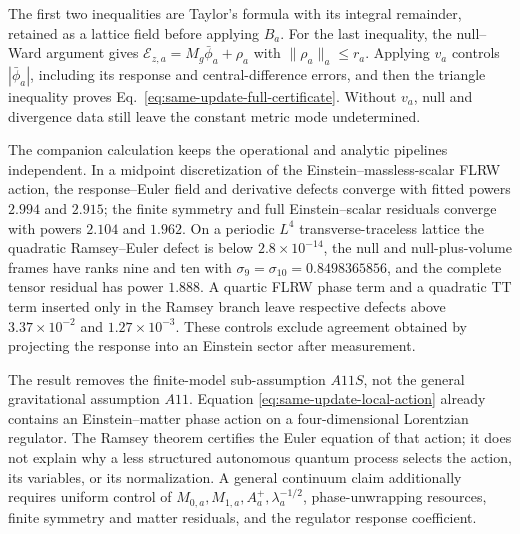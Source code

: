 The first two inequalities are Taylor's formula with its integral remainder,
retained as a lattice field before applying \(B_a\).  For the last inequality,
the null--Ward argument gives
\(\mathcal E_{z,a}=M_g\bar\phi_a+\rho_a\) with
\(\|\rho_a\|_a\le r_a\).  Applying \(v_a\) controls
\(|\bar\phi_a|\), including its response and central-difference errors, and
then the triangle inequality proves
Eq.~\eqref{eq:same-update-full-certificate}.  Without \(v_a\), null and
divergence data still leave the constant metric mode undetermined.

The companion calculation \cite{XuSameUpdateEinstein2026} keeps the
operational and analytic pipelines independent.  In a midpoint discretization
of the Einstein--massless-scalar FLRW action, the response--Euler field and
derivative defects converge with fitted powers \(2.994\) and \(2.915\);
the finite symmetry and full Einstein--scalar residuals converge with powers
\(2.104\) and \(1.962\).  On a periodic \(L^4\) transverse-traceless
lattice the quadratic Ramsey--Euler defect is below
\(2.8\times10^{-14}\), the null and null-plus-volume frames have ranks nine
and ten with
\(\sigma_9=\sigma_{10}=0.8498365856\), and the complete tensor residual has
power \(1.888\).  A quartic FLRW phase term and a quadratic TT term inserted
only in the Ramsey branch leave respective defects above
\(3.37\times10^{-2}\) and \(1.27\times10^{-3}\).  These controls exclude
agreement obtained by projecting the response into an Einstein sector after
measurement.

The result removes the finite-model sub-assumption \(A11S\), not the general
gravitational assumption \(A11\).  Equation
\eqref{eq:same-update-local-action} already contains an Einstein--matter phase
action on a four-dimensional Lorentzian regulator.  The Ramsey theorem
certifies the Euler equation of that action; it does not explain why a less
structured autonomous quantum process selects the action, its variables, or
its normalization.  A general continuum claim additionally requires uniform
control of \(M_{0,a},M_{1,a},A_a^+,\lambda_a^{-1/2}\), phase-unwrapping
resources, finite symmetry and matter residuals, and the regulator response
coefficient.

